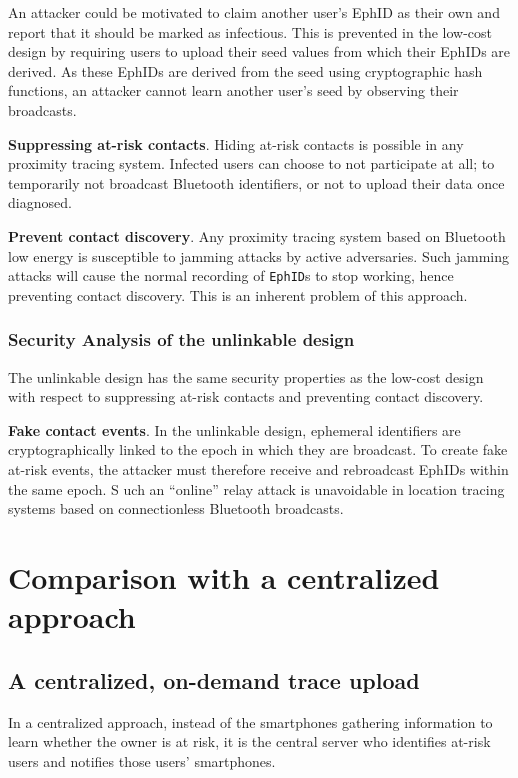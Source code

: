 \documentclass[10.8pt,a4paper]{article}
\begin{document}
An attacker could be motivated to claim another user’s EphID as their own and report that it should be marked as infectious. This is prevented in the low-cost design by requiring users to upload their seed values from which their EphIDs are derived. As these EphIDs are derived from the seed using cryptographic hash functions, an attacker cannot learn another user’s seed by observing their broadcasts.

\textbf{Suppressing at-risk contacts}. Hiding at-risk contacts is possible in any proximity tracing system. Infected users can choose to not participate at all; to temporarily not broadcast Bluetooth identifiers, or not to upload their data once diagnosed.

\textbf{Prevent contact discovery}. Any proximity tracing system based on Bluetooth low energy is susceptible to jamming attacks by active adversaries. Such jamming attacks will cause the normal recording of \texttt{EphID}s to stop working, hence preventing contact discovery. This is an inherent problem of this approach.


\subsubsection{Security Analysis of the unlinkable design}

The unlinkable design has the same security properties as the low-cost design with respect to suppressing at-risk contacts and preventing contact discovery.

\textbf{Fake contact events}.  In the unlinkable design, ephemeral identifiers are cryptographically linked to the  epoch in which they are broadcast. To create fake at-risk events, the attacker must therefore receive and rebroadcast EphIDs  within the same epoch. S  uch an “online” relay attack is unavoidable in location tracing systems based on connectionless Bluetooth broadcasts.

\section{Comparison with a centralized approach}
\subsection{A centralized, on-demand trace upload}
In a centralized approach, instead of the smartphones gathering information to learn whether the owner is at risk, it is the central server who identifies at-risk users and notifies those users' smartphones.
\end{document}
